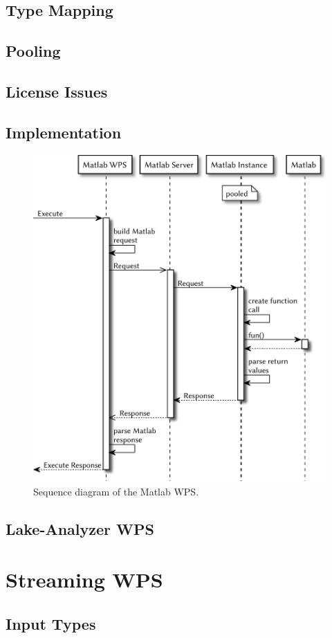 		\subsection{Type Mapping}
		\subsection{Pooling}
		\subsection{License Issues}
		\subsection{Implementation}
		\begin{figure}[!htb]
			\centering
			\includegraphics[width=.8125\textwidth]{figures/sequence-diagramm-mwps.pdf}
			\caption{\label{fig:sd:mwps} Sequence diagram of the Matlab WPS.} %
		\end{figure}
		\subsection{Lake-Analyzer WPS}
	\section{Streaming WPS}
		\subsection{Input Types}
